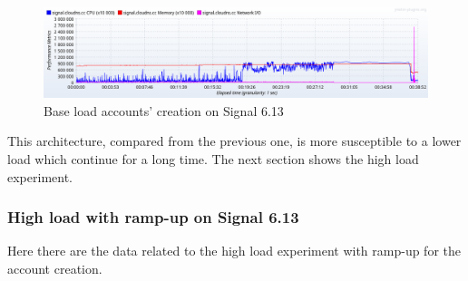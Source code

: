 \begin{figure}[H]
    \centering
    \includegraphics[width=\textwidth]{images/613/signal-base-create-load}
    \caption{Base load accounts' creation on Signal 6.13}
    \label{fig:signalbasecreateloadnew}
\end{figure}

This architecture, compared from the previous one, is more susceptible to a lower load which continue for a long time.
The next section shows the high load experiment.

\subsubsection{High load with ramp-up on Signal 6.13}

Here there are the data related to the high load experiment with ramp-up for the account creation.

